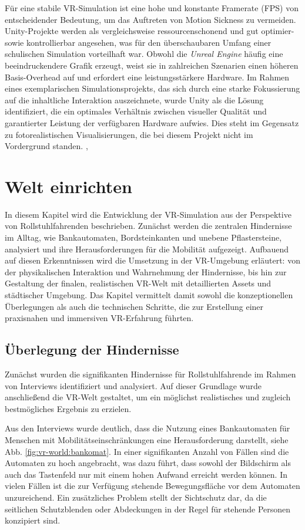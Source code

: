 Für eine stabile VR-Simulation ist eine hohe und konstante Framerate (FPS) von entscheidender Bedeutung, um das Auftreten von Motion Sickness zu vermeiden. Unity-Projekte werden als vergleichsweise ressourcenschonend und gut optimier- sowie kontrollierbar angesehen, was für den überschaubaren Umfang einer schulischen Simulation vorteilhaft war. Obwohl die \textit{Unreal Engine} häufig eine beeindruckendere Grafik erzeugt, weist sie in zahlreichen Szenarien einen höheren Basis-Overhead auf und erfordert eine leistungsstärkere Hardware. Im Rahmen eines exemplarischen Simulationsprojekts, das sich durch eine starke Fokussierung auf die inhaltliche Interaktion auszeichnete, wurde Unity als die Lösung identifiziert, die ein optimales Verhältnis zwischen visueller Qualität und garantierter Leistung der verfügbaren Hardware aufwies. Dies steht im Gegensatz zu fotorealistischen Visualisierungen, die bei diesem Projekt nicht im Vordergrund standen.
\cite{NimrodKramer2024}, \cite{YuriPitomcev2025}

\section{Welt einrichten}
In diesem Kapitel wird die Entwicklung der VR-Simulation aus der Perspektive von Rollstuhlfahrenden beschrieben. Zunächst werden die zentralen Hindernisse im Alltag, wie Bankautomaten, Bordsteinkanten und unebene Pflastersteine, analysiert und ihre Herausforderungen für die Mobilität aufgezeigt. Aufbauend auf diesen Erkenntnissen wird die Umsetzung in der VR-Umgebung erläutert: von der physikalischen Interaktion und Wahrnehmung der Hindernisse, bis hin zur Gestaltung der finalen, realistischen VR-Welt mit detaillierten Assets und städtischer Umgebung. Das Kapitel vermittelt damit sowohl die konzeptionellen Überlegungen als auch die technischen Schritte, die zur Erstellung einer praxisnahen und immersiven VR-Erfahrung führten.

\subsection{Überlegung der Hindernisse}
Zunächst wurden die signifikanten Hindernisse für Rollstuhlfahrende im Rahmen von Interviews identifiziert und analysiert. Auf dieser Grundlage wurde anschließend die VR-Welt gestaltet, um ein möglichst realistisches und zugleich bestmögliches Ergebnis zu erzielen.

Aus den Interviews wurde deutlich, dass die Nutzung eines Bankautomaten für Menschen mit Mobilitätseinschränkungen eine Herausforderung darstellt, siehe Abb. \ref{fig:vr-world:bankomat}. In einer signifikanten Anzahl von Fällen sind die Automaten zu hoch angebracht, was dazu führt, dass sowohl der Bildschirm als auch das Tastenfeld nur mit einem hohen Aufwand erreicht werden können. In vielen Fällen ist die zur Verfügung stehende Bewegungsfläche vor dem Automaten unzureichend. Ein zusätzliches Problem stellt der Sichtschutz dar, da die seitlichen Schutzblenden oder Abdeckungen in der Regel für stehende Personen konzipiert sind.


